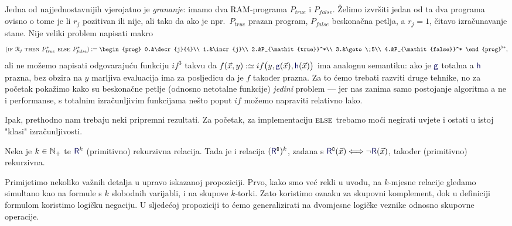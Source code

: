 Jedna od najjednostavnijih vjerojatno je \emph{grananje}: imamo dva RAM-programa $P_{\mathit{true}}$ i $P_{\mathit{false}}$. Želimo izvršiti jedan od ta dva programa ovisno o tome je li $r_j$ pozitivan ili nije, ali tako da ako je npr.\ $P_{\mathit{true}}$ prazan program, $P_{\mathit{false}}$ beskonačna petlja, a $r_j=1$, čitavo izračunavanje stane. Nije veliki problem napisati makro
\begin{equation}
    (\textsc{if $\reg{j}$ then $P_{\mathit{true}}^*$ else $P_{\mathit{false}}^*$}):=\begin{prog}
    0.&\decr{j}{4}\\
    1.&\incr{j}\\
    2.&P_{\mathit{true}}^*\\
    3.&\goto\;5\\
    4.&P_{\mathit{false}}^*
    \end{prog}^{\flat*}\text,
\end{equation}
ali ne možemo napisati odgovarajuću funkciju $if^3$ takvu da $f(\vec x,y):\simeq if\bigl(y,\f g(\vec x),\f h(\vec x)\bigr)$ ima analognu semantiku: ako je $\f g$ totalna a $\f h$ prazna, bez obzira na $y$ marljiva evaluacija ima za posljedicu da je $f$ također prazna. Za to ćemo trebati razviti druge tehnike, no za početak pokažimo kako su beskonačne petlje (odnosno netotalne funkcije) \emph{jedini} problem --- jer nas zanima samo postojanje algoritma a ne i performanse, s totalnim izračunljivim funkcijama nešto poput $if$ možemo napraviti relativno lako. 

Ipak, prethodno nam trebaju neki pripremni rezultati. Za početak, za implementaciju $\textsc{else}$ trebamo moći negirati uvjete i ostati u istoj "klasi" izračunljivosti.

\begin{propozicija}[{name=[komplement čuva (primitivnu) rekurzivnost]}]\label{prop:kompl}
Neka je $k\in{\mathbb N}_+$ te $\f R^k$ (primitivno) rekurzivna relacija. Tada je i relacija $(\f R\kompl)^k$, zadana s $\f R\kompl(\vec x)\Longleftrightarrow\lnot \f R(\vec x)$, također (primitivno) rekurzivna.
\end{propozicija}

Primijetimo nekoliko važnih detalja u upravo iskazanoj propoziciji. Prvo, kako smo već rekli u uvodu, na $k$-mjesne relacije gledamo simultano kao na formule s $k$ slobodnih varijabli, i na skupove $k$-torki. Zato koristimo oznaku za skupovni komplement, dok u definiciji formulom koristimo logičku negaciju. U sljedećoj propoziciji to ćemo generalizirati na dvomjesne logičke veznike odnosno skupovne operacije.


